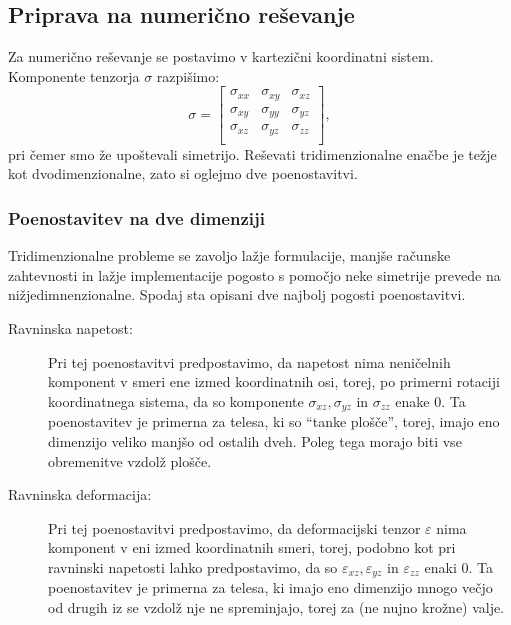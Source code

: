 \documentclass[12pt,a4paper]{article}
\theoremstyle{definition} %
\theoremstyle{plain} %
\numberwithin{equation}{section}
\newcommand{\eps}{\varepsilon}
\newcommand{\ts}{\sigma}
\begin{document}
\subsection{Priprava na numerično reševanje}
Za numerično reševanje se postavimo v kartezični koordinatni sistem.
Komponente tenzorja $\ts$ razpišimo:
\[
  \ts =
  \begin{bmatrix}
    \ts_{xx} & \ts_{xy} & \ts_{xz} \\
    \ts_{xy} & \ts_{yy} & \ts_{yz} \\
    \ts_{xz} & \ts_{yz} & \ts_{zz} \\
  \end{bmatrix},
\]
pri čemer smo že upoštevali simetrijo. Reševati tridimenzionalne enačbe je težje
kot dvodimenzionalne, zato si oglejmo dve poenostavitvi.

\subsubsection{Poenostavitev na dve dimenziji}
Tridimenzionalne probleme se zavoljo lažje formulacije, manjše računske
zahtevnosti in lažje implementacije pogosto s pomočjo neke simetrije prevede na
nižjedimnenzionalne. Spodaj sta opisani dve najbolj pogosti poenostavitvi.

\begin{description}
  \item[Ravninska napetost:]
Pri tej poenostavitvi predpostavimo, da napetost nima neničelnih komponent v
smeri ene izmed koordinatnih osi, torej, po primerni rotaciji koordinatnega
sistema, da so komponente $\ts_{xz}, \ts_{yz}$ in $\ts_{zz}$ enake 0. Ta
poenostavitev je primerna za telesa, ki so ``tanke plošče'', torej, imajo eno
dimenzijo veliko manjšo od ostalih dveh. Poleg tega morajo biti vse obremenitve
vzdolž plošče.
  \item[Ravninska deformacija:]
Pri tej poenostavitvi predpostavimo, da deformacijski tenzor $\eps$ nima
komponent v eni izmed koordinatnih smeri, torej, podobno kot pri ravninski
napetosti lahko predpostavimo, da so $\eps_{xz}, \eps_{yz}$ in $\eps_{zz}$ enaki
0. Ta poenostavitev je primerna za telesa, ki imajo eno dimenzijo mnogo večjo od
drugih iz se vzdolž nje ne spreminjajo, torej za (ne nujno krožne) valje.
\end{description}
\end{document}

